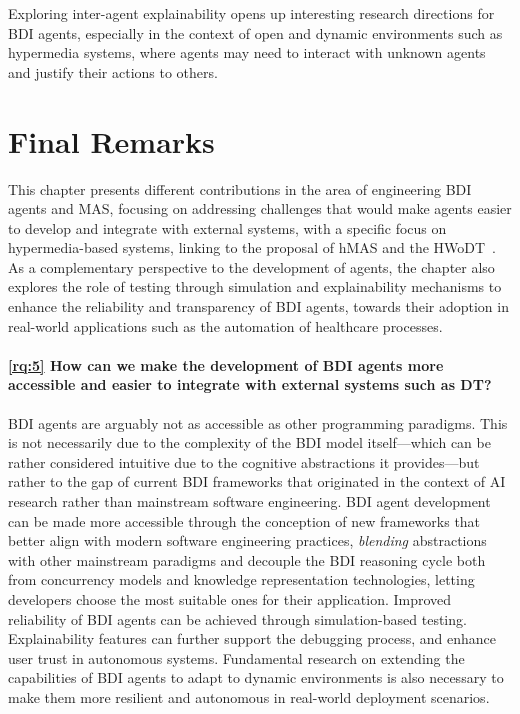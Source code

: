 Exploring inter-agent explainability opens up interesting research directions for \ac{BDI} agents, especially in the context of open and dynamic environments such as hypermedia systems, where agents may need to interact with unknown agents and justify their actions to others.



\section{Final Remarks}


This chapter presents different contributions in the area of engineering \ac{BDI} agents and \ac{MAS}, 
focusing on addressing challenges that would make agents easier to develop and integrate with external systems, with a specific focus on hypermedia-based systems, linking to the proposal of \ac{hMAS} and the \ac{HWoDT}~.
%
As a complementary perspective to the development of agents, the chapter also explores the role of testing through simulation and explainability mechanisms to enhance the reliability and transparency of \ac{BDI} agents, towards their adoption in real-world applications such as the automation of healthcare processes.

\paragraph{\ref{rq:5} How can we make the development of \ac{BDI} agents more accessible and easier to integrate with external systems such as \ac{DT}?}

\ac{BDI} agents are arguably not as accessible as other programming paradigms. 
This is not necessarily due to the complexity of the \ac{BDI} model itself---which can be rather considered intuitive due to the cognitive abstractions it provides---but rather to the gap of current \ac{BDI} frameworks that originated in the context of \ac{AI} research rather than mainstream software engineering.
%
\ac{BDI} agent development can be made more accessible through the conception of new frameworks that better align with modern software engineering practices, \emph{blending} abstractions with other mainstream paradigms and decouple the \ac{BDI} reasoning cycle both from concurrency models and knowledge representation technologies, letting developers choose the most suitable ones for their application.
%
Improved reliability of \ac{BDI} agents can be achieved through simulation-based testing. Explainability features can further support the debugging process, and enhance user trust in autonomous systems. 
%
Fundamental research on extending the capabilities of \ac{BDI} agents to adapt to dynamic environments is also necessary to make them more resilient and autonomous in real-world deployment scenarios.  